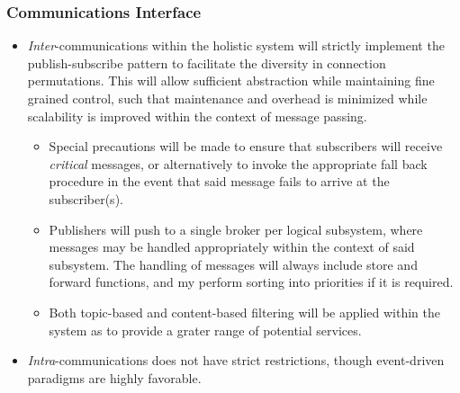 \subsubsection{Communications Interface}
\begin{itemize}
	\item \textit{Inter}-communications within the holistic system will strictly implement the publish-subscribe pattern to facilitate the diversity in connection permutations. This will allow sufficient abstraction while maintaining fine grained control, such that maintenance and overhead is minimized while scalability is improved within the context of message passing.
	\begin{itemize}
		\item Special precautions will be made to ensure that subscribers will receive \textit{critical} messages, or alternatively to invoke the appropriate fall back procedure in the event that said message fails to arrive at the subscriber(s).
		
		\item Publishers will push to a single broker per logical subsystem, where messages may be handled appropriately within the context of said subsystem. The handling of messages will always include store and forward functions, and my perform sorting into priorities if it is required.
		
		\item Both topic-based and content-based filtering will be applied within the system as to provide a grater range of potential services.
	\end{itemize}
	\item \textit{Intra}-communications does not have strict restrictions, though event-driven paradigms are highly favorable.
\end{itemize}


